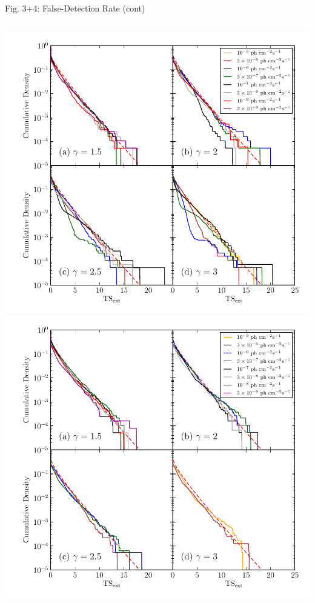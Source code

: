 \documentclass[12pt]{beamer}
\begin{document}
\begin{frame}{Fig. 3+4: False-Detection Rate (cont)}
  \begin{columns}
    \includegraphics[scale=0.35]{plots/ts_ext_emin_1000_color.pdf}
    \includegraphics[scale=0.35]{plots/ts_ext_emin_10000_color.pdf}
  \end{columns}
\end{frame}
\end{document}
